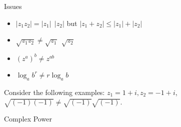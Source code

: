 \documentclass[11pt]{beamer}
\theoremstyle{plain}
\begin{document}
\begin{frame}{Issues}
    \begin{itemize}
        \item $|z_1 z_2|=|z_1|\:\:|z_2|$ but $|z_1+z_2|\leq |z_1|+|z_2|$
        \item $\sqrt{z_1 z_2}\neq \sqrt{z_1}\:\: \sqrt{z_2}$
        \item $(z^a)^b\neq z^{ab}$
        \item $\log_a b^r\neq r \log_a b$
    \end{itemize}
Consider the following examples: $z_1=1+i,z_2=-1+i$, $\sqrt{(-1)(-1)}\neq \sqrt{(-1)}\sqrt{(-1)}$.  
\end{frame}
\begin{frame}{Complex Power}
    
\end{frame}
\end{document}
